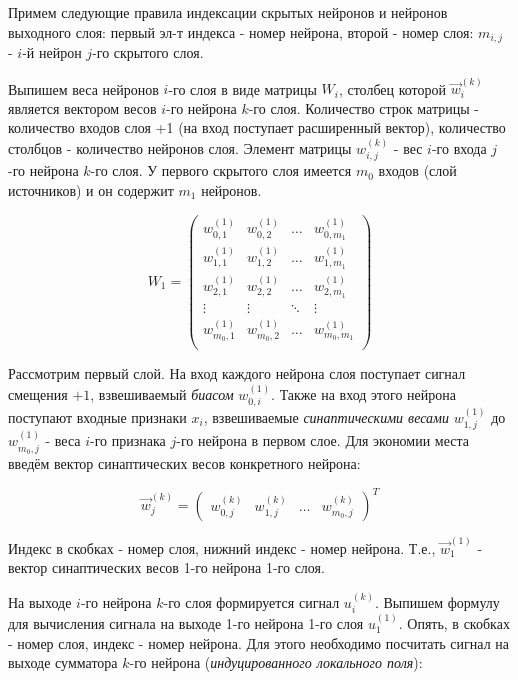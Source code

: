 \documentclass[a4paper]{article}
\numberwithin{equation}{subsection}
\begin{document}
Примем следующие правила индексации скрытых нейронов и нейронов выходного слоя:
первый эл-т индекса - номер нейрона, второй - номер слоя: 
$m_{i,j}$  - $i$-й нейрон $j$-го скрытого слоя.

Выпишем веса нейронов $i$-го слоя в виде матрицы $W_i$, столбец которой 
$\vec{w}_i^{(k)}$ является вектором весов $i$-го нейрона $k$-го слоя.
Количество строк матрицы - количество входов слоя \glqq +1\grqq 
(на вход поступает расширенный вектор), количество столбцов - количество нейронов слоя.
Элемент матрицы $w_{i,j}^{(k)}$ - вес $i$-го входа $j$-го нейрона $k$-го слоя.
У первого скрытого слоя имеется $m_0$ входов (слой источников) 
и он содержит $m_1$ нейронов.

\begin{equation}
    W_1 = 
    \begin{pmatrix}
        w_{0,1}^{(1)} & w_{0,2}^{(1)} & \dots & w_{0,{m_1}}^{(1)} \\
        w_{1,1}^{(1)} & w_{1,2}^{(1)} & \dots & w_{1,{m_1}}^{(1)} \\
        w_{2,1}^{(1)} & w_{2,2}^{(1)} & \dots & w_{2,{m_1}}^{(1)} \\
        \vdots        & \vdots        & \ddots & \vdots           \\
        w_{{m_0},1}^{(1)} & w_{{m_0},2}^{(1)} & \dots & w_{{m_0},{m_1}}^{(1)} \\
    \end{pmatrix}
\end{equation}

Рассмотрим первый слой.
На вход каждого нейрона слоя поступает сигнал смещения $+1$, взвешиваемый 
\textit{биасом} $w_{0,i}^{(1)}$. 
Также на вход этого нейрона поступают входные признаки $x_i$, взвешиваемые 
\textit{синаптическими весами} $w_{1,j}^{(1)}$ до $w_{{m_0},j}^{(1)}$ - веса $i$-го признака $j$-го нейрона в первом слое.   
Для экономии места введём вектор синаптических весов конкретного нейрона:

\begin{equation}
    \vec{w}_j^{(k)} = 
    \begin{pmatrix}
        w_{0,j}^{(k)} & w_{1,j}^{(k)} & \dots & w_{{m_0},j}^{(k)}
    \end{pmatrix}
    ^T
\end{equation}


Индекс в скобках - номер слоя, нижний индекс - номер нейрона. Т.е., $\vec{w}_1^{(1)}$ - вектор синаптических весов 1-го нейрона 1-го слоя.

На выходе $i$-го нейрона $k$-го слоя формируется сигнал $u_i^{(k)}$. 
Выпишем формулу для вычисления сигнала на выходе 1-го нейрона 1-го слоя $u_1^{(1)}$. Опять, в скобках - номер слоя, индекс - номер нейрона.
Для этого необходимо посчитать сигнал на выходе сумматора $k$-го нейрона (\textit{индуцированного локального поля}):
\end{document}
